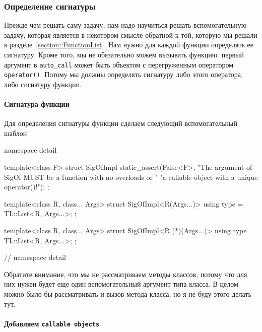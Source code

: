 \subsubsection{Определение сигнатуры}

Прежде чем решать саму задачу, нам надо научиться решать вспомогательную задачу, которая является в некотором смысле обратной к той, которую мы решали в разделе~\ref{section::FunctionList}.
Нам нужно для каждой функции определять ее сигнатуру.
Кроме того, мы не обязательно можем вызывать функцию.
первый аргумент в \verb"auto_call" может быть объектом с перегруженным оператором \verb"operator()".
Потому мы должны определять сигнатуру либо этого оператора, либо сигнатуру функции.

\paragraph{Сигнатура функции}

Для определения сигнатуры функции сделаем следующий вспомогательный шаблон
\begin{cppcode}
namespace detail {
template<class F>
struct SigOfImpl {
  static_assert(False<F>,
                "The argument of SigOf MUST be a function with no overloads or "
                "a callable object with a unique operator()!");
};

template<class R, class... Args>
struct SigOfImpl<R(Args...)> {
  using type = TL::List<R, Args...>;
};

template<class R, class... Args>
struct SigOfImpl<R (*)(Args...)> {
  using type = TL::List<R, Args...>;
};
} // namespace detail
\end{cppcode}
Обратите внимание, что мы не рассматриваем методы классов, потому что для них нужен будет еще один вспомогательный аргумент типа класса.
В целом можно было бы рассматривать и вызов метода класса, но я не буду этого делать тут.

\paragraph{Добавляем \texttt{callable objects}}

